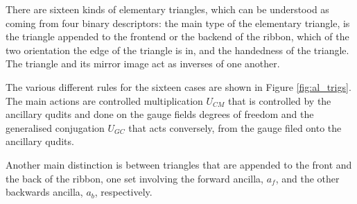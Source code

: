 \documentclass[two column]{article}
\begin{document}
There are sixteen kinds of elementary triangles, which can be understood as coming from four binary descriptors: the main type of the elementary triangle, is the triangle appended to the frontend or the backend of the ribbon, which of the two orientation the edge of the triangle is in, and the handedness of the triangle. The triangle and its mirror image act as inverses of one another.

The various different rules for the sixteen cases are shown in Figure \ref{fig:al_trigs}. The main actions are controlled multiplication $U_{CM}$ that is controlled by the ancillary qudits and done on the gauge fields degrees of freedom and the generalised conjugation $U_{GC}$ that acts conversely, from the gauge filed onto the ancillary qudits.

Another main distinction is between triangles that are appended to the front and the back of the ribbon, one set involving the forward ancilla, $a_f$, and the other backwards ancilla, $a_b$, respectively. 
\end{document}

